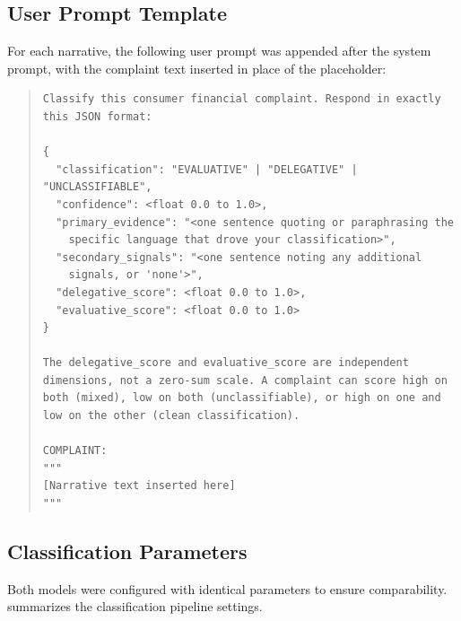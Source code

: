 \subsection{User Prompt Template}

For each narrative, the following user prompt was appended after the system prompt, with the complaint text inserted in place of the placeholder:

\begin{quote}
\begin{small}
\begin{verbatim}
Classify this consumer financial complaint. Respond in exactly
this JSON format:

{
  "classification": "EVALUATIVE" | "DELEGATIVE" | "UNCLASSIFIABLE",
  "confidence": <float 0.0 to 1.0>,
  "primary_evidence": "<one sentence quoting or paraphrasing the
    specific language that drove your classification>",
  "secondary_signals": "<one sentence noting any additional
    signals, or 'none'>",
  "delegative_score": <float 0.0 to 1.0>,
  "evaluative_score": <float 0.0 to 1.0>
}

The delegative_score and evaluative_score are independent
dimensions, not a zero-sum scale. A complaint can score high on
both (mixed), low on both (unclassifiable), or high on one and
low on the other (clean classification).

COMPLAINT:
"""
[Narrative text inserted here]
"""
\end{verbatim}
\end{small}
\end{quote}

\subsection{Classification Parameters}

Both models were configured with identical parameters to ensure comparability.  summarizes the classification pipeline settings.

